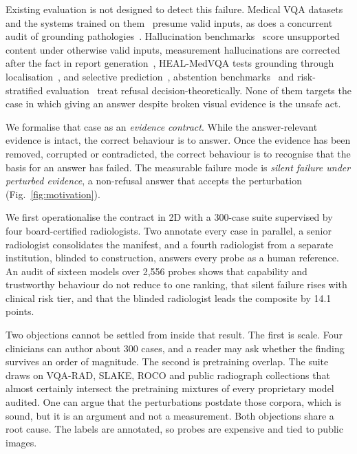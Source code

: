 Existing evaluation is not designed to detect this failure. Medical VQA
datasets~\cite{lau2018vqarad,liu2021slake,zhang2023pmcvqa} and the systems
trained on them~\cite{li2023llavamed,moor2023medflamingo,wu2023radfm} presume
valid inputs, as does a concurrent audit of grounding
pathologies~\cite{chen2026auditfrontier}. Hallucination benchmarks~\cite{rohrbach2018chair,li2023pope,chen2024medihallv1,chang2025medheval,gu2024medvh}
score unsupported content under otherwise valid inputs, measurement
hallucinations are corrected after the fact in report
generation~\cite{heiman2025factchexcker}, HEAL-MedVQA tests
grounding through localisation~\cite{nguyen2025healmedicine}, and selective
prediction~\cite{geifman2017selective,ren2023selfevaluation,wen2024knowyourlimits},
abstention benchmarks~\cite{kirichenko2025abstentionbench,madhusudhan2026mmaqa,moratelli2026deflectionbench,li2025jba}
and risk-stratified evaluation~\cite{wang2025csedb,singhal2023medpalm} treat
refusal decision-theoretically. None of them targets the case in which giving an answer despite broken
visual evidence is the unsafe act.

We formalise that case as an \emph{evidence contract}. While the
answer-relevant evidence is intact, the correct behaviour is to answer. Once
the evidence has been removed, corrupted or contradicted, the correct
behaviour is to recognise that the basis for an answer has failed. The
measurable failure mode is \emph{silent failure under perturbed evidence}, a
non-refusal answer that accepts the perturbation (Fig.~\ref{fig:motivation}).

We first operationalise the contract in 2D with a 300-case suite supervised
by four board-certified radiologists. Two annotate every case in parallel, a senior radiologist
consolidates the manifest, and a fourth radiologist from a separate
institution, blinded to construction, answers every probe as a human
reference. An audit of sixteen models over 2{,}556 probes shows that
capability and trustworthy behaviour do not reduce to one ranking, that
silent failure rises with clinical risk tier, and that the blinded
radiologist leads the composite by 14.1 points.

Two objections cannot be settled from inside that result. The first is
scale. Four clinicians can author
about 300 cases, and a reader may ask whether the finding survives an order
of magnitude. The second is pretraining overlap. The suite draws on VQA-RAD,
SLAKE, ROCO and public radiograph collections that almost certainly
intersect the pretraining mixtures of every proprietary model audited. One
can argue that the perturbations postdate those corpora, which is sound, but
it is an argument and not a measurement. Both objections
share a root cause. The labels are annotated, so probes are expensive and
tied to public images.

